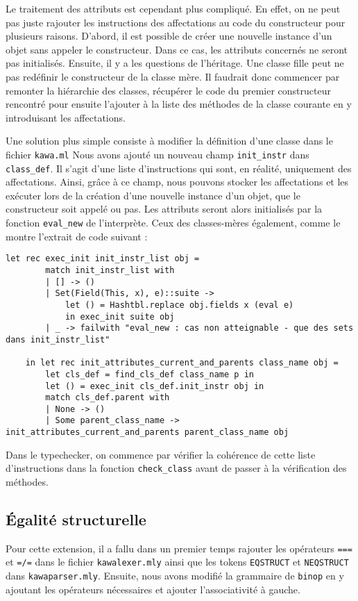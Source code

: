 \documentclass{article}
\begin{document}
Le traitement des attributs est cependant plus compliqué.
En effet, on ne peut pas juste rajouter les instructions des affectations au code du constructeur pour 
plusieurs raisons. D'abord, il est possible de créer une nouvelle 
instance d'un objet sans appeler le constructeur. Dans ce cas, les attributs concernés
ne seront pas initialisés. Ensuite, il y a les questions de l'héritage.
Une classe fille peut ne pas redéfinir le constructeur de la classe mère. Il faudrait donc commencer 
par remonter la hiérarchie des classes, récupérer le code du premier constructeur rencontré pour ensuite
l'ajouter à la liste des méthodes de la classe courante en y introduisant les affectations.


Une solution plus simple consiste à modifier 
la définition d'une classe dans le fichier \texttt{kawa.ml}
Nous avons ajouté un nouveau champ \texttt{init\_instr} 
dans \texttt{class\_def}. Il s'agit d'une liste 
d'instructions qui sont, en réalité, uniquement 
des affectations. Ainsi, grâce à ce champ, nous pouvons 
stocker les affectations et les exécuter lors de la création d'une nouvelle instance 
d'un objet, que le constructeur soit appelé ou pas. Les attributs seront alors 
initialisés par la fonction \texttt{eval\_new} de l'interprète. Ceux des 
classes-mères également, comme le montre l'extrait de code suivant : \\
\begin{lstlisting}[style=mystyle, language=caml]
    let rec exec_init init_instr_list obj = 
        match init_instr_list with
        | [] -> ()
        | Set(Field(This, x), e)::suite -> 
            let () = Hashtbl.replace obj.fields x (eval e) 
            in exec_init suite obj
        | _ -> failwith "eval_new : cas non atteignable - que des sets dans init_instr_list"

    in let rec init_attributes_current_and_parents class_name obj = 
        let cls_def = find_cls_def class_name p in  
        let () = exec_init cls_def.init_instr obj in 
        match cls_def.parent with
        | None -> ()
        | Some parent_class_name -> init_attributes_current_and_parents parent_class_name obj
\end{lstlisting}

Dans le typechecker, on commence par vérifier la cohérence de cette liste 
d'instructions dans la fonction \texttt{check\_class} avant de passer à la vérification des méthodes.


\subsection{Égalité structurelle}
Pour cette extension, il a fallu dans un premier temps rajouter les opérateurs \texttt{===} et \texttt{=/=} dans le fichier \texttt{kawalexer.mly} ainsi que 
les tokens \texttt{EQSTRUCT} et \texttt{NEQSTRUCT} 
dans \texttt{kawaparser.mly}. Ensuite, nous avons modifié la grammaire de 
\texttt{binop} en y ajoutant les opérateurs nécessaires 
et ajouter l'associativité à gauche. \\
\end{document}
